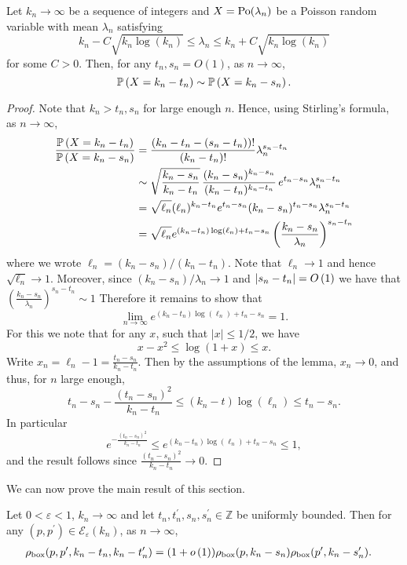 \begin{lemma}\label{lem:finite_shifts_poisson}
Let $k_n \to \infty$ be a sequence of integers and $X = {\mathrm{Po}}(\lambda_n)$ be a Poisson random variable with mean $\lambda_n$ satisfying
\[
		k_n - C\sqrt{k_n \log(k_n)} \le \lambda_n \le k_n + C\sqrt{k_n \log(k_n)}
\]
for some $C > 0$. Then, for any $t_n, s_n = O(1)$, as $n \to \infty$,
\[
	\mathbb{P}\left(X = k_n - t_n\right) \sim \mathbb{P}\left(X = k_n - s_n\right).
\]
\end{lemma}

\begin{proof}
Note that $k_n > t_n, s_n$ for large enough $n$. Hence, using Stirling's formula, as $n \to \infty$,
\begin{align*}
	\frac{\mathbb{P}\left(X = k_n - t_n\right)}{\mathbb{P}\left(X = k_n - s_n\right)}
	&= \frac{(k_n - t_n - (s_n-t_n))!}{(k_n - t_n)!} \lambda_n^{s_n - t_n} \\
	&\sim \sqrt{\frac{k_n - s_n}{k_n - t_n}} \, \frac{(k_n-s_n)^{k_n - s_n}}{(k_n - t_n)^{k_n - t_n}} \, e^{t_n - s_n} 
		\lambda_n^{s_n-t_n} \\
	&= \sqrt{\ell_n} (\ell_n)^{k_n - t_n} e^{t_n - s_n} (k_n - s_n)^{t_n - s_n} \lambda_n^{s_n-t_n}\\
	&= \sqrt{\ell_n} e^{(k_n - t_n)\log(\ell_n) + t_n - s_n} \left(\frac{k_n - s_n}{\lambda_n}\right)^{s_n - t_n}
\end{align*}
where we wrote $\ell_n = (k_n - s_n)/(k_n - t_n)$. Note that $\ell_n \to 1$ and hence $\sqrt{\ell_n} \to 1$. Moreover, since $(k_n - s_n)/\lambda_n \to 1$ and $|s_n - t_n| = O\left(1\right)$ we have that $\left(\frac{k_n - s_n}{\lambda_n}\right)^{s_n - t_n} \sim 1$ Therefore it remains to show that
\[
	\lim_{n \to \infty} e^{(k_n - t_n)\log(\ell_n) + t_n - s_n} = 1.
\] 
For this we note that for any $x$, such that $|x| \le 1/2$, we have 
\[
	x - x^2 \le \log(1+x) \le x.
\]
Write $x_n = \ell_n - 1 = \frac{t_n - s_n}{k_n - t_n}$. Then by the assumptions of the lemma, $x_n \to 0$, and thus, for $n$ large enough,
\[
	t_n - s_n - \frac{(t_n - s_n)^2}{k_n - t_n}
	\le (k_n-t)\log\left(\ell_n\right)
	\le t_n - s_n.
\]
In particular
\[
	e^{-\frac{(t_n-s_n)^2}{k_n-t_n}}
	\le e^{(k_n - t_n)\log(\ell_n) + t_n - s_n} \le 1,
\]
and the result follows since $\frac{(t_n-s_n)^2}{k_n-t_n} \to 0$.
\end{proof}

We can now prove the main result of this section.

\begin{lemma}\label{lem:joint_degree_factorization}
Let $0 < \varepsilon < 1$, $k_n \to \infty$ and let $t_n,t^\prime_n, s_n, s_n^\prime \in \mathbb{Z}$ be uniformly bounded.
Then for any $(p,p^\prime) \in \mathcal{E}_\varepsilon(k_n)$, as $n \to \infty$,
\begin{align*}
	\rho_{\text{box}}(p,p^\prime,k_n - t_n,k_n - t_n^\prime)
	&= (1+o\left(1\right))\rho_{\text{box}}(p,k_n - s_n)\rho_{\text{box}}(p^\prime,k_n-s_n^\prime).
\end{align*}
\end{lemma}

